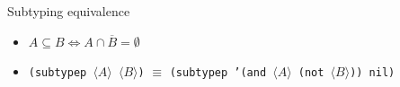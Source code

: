 \documentclass[aspectratio=169]{beamer}
\renewcommand\code[1]{\texttt{#1}}
\newcommand\plholder[1]{\ensuremath{\langle {#1} \rangle}}
\begin{document}
\begin{frame}[fragile]
  \begin{popup}{.75}
    \begin{macosbox}{Subtyping equivalence}
      \begin{itemize}
      \item $A \subseteq B \Leftrightarrow A \cap \overline B
        = \emptyset$
      \item {\small\code{(subtypep \plholder A \plholder B)} $\equiv$
        \code{(subtypep '(and \plholder A (not \plholder B)) nil)}}
      \end{itemize}
    \end{macosbox}
  \end{popup}
\end{frame}
\end{document}
